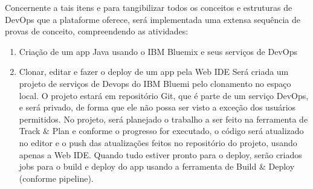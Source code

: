 Concernente a tais itens e para tangibilizar todos os conceitos e estruturas de DevOps que a plataforme oferece, será implementada uma extensa sequência de provas de conceito, compreendendo as atividades:
\begin{enumerate}
    \item Criação de um app Java usando o IBM Bluemix e seus serviços de DevOps
    \item Clonar, editar e fazer o deploy de um app pela Web IDE
    Será criada um projeto de serviços de Devops do IBM Bluemi pelo
    clonamento no espaço local. O projeto estará em repositório Git,
    que é parte de um serviço DevOps, e será privado, de forma que
    ele não possa ser visto a exceção dos usuários permitidos. No
    projeto, será planejado o trabalho a ser feito na ferramenta de
    Track \& Plan e conforme o progresso for executado, o código será 
    atualizado no editor e o push das atualizações feitos no
    repositório do projeto, usando apenas a Web IDE.
    Quando tudo estiver pronto para o deploy, serão criados jobs
    para o build e deploy do app usando a ferramenta de Build \& Deploy
    (conforme pipeline).


\end{enumerate}
